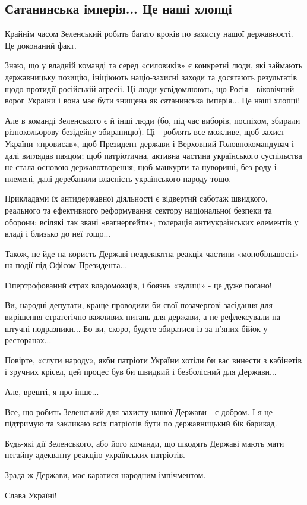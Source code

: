  
 
 
 
 

\subsection{Сатанинська імперія... Це наші хлопці}

Крайнім часом Зеленський робить багато кроків по захисту нашої державності. Це доконаний факт.

Знаю, що у владній команді та серед «силовиків» є конкретні люди, які займають
державницьку позицію, ініціюють націо-захисні заходи та досягають результатів
щодо протидії російській агресіі. Ці люди усвідомлюють, що Росія - віковічний
ворог України і вона має бути знищена як сатанинська імперія... Це наші хлопці!

Але в команді Зеленського є й інші люди (бо, під час виборів, поспіхом, збирали
різнокольорову безідейну збираницю). Ці - роблять все можливе, щоб захист
України «провисав», щоб Президент держави і Верховний Головнокомандувач і далі
виглядав паяцом; щоб патріотична, активна частина українського суспільства не
стала основою державотворення; щоб манкурти та нувориші, без роду і племені,
далі деребанили власність українського народу тощо.

Прикладами їх антидержавної діяльності є відвертий саботаж швидкого, реального
та ефективного реформування сектору національної безпеки та оборони; всілякі
так звані «вагнергейти»; толерація антиукраїнських елементів у владі і близько
до неї тощо...

Також, не йде на користь Державі неадекватна реакція частини «монобільшості» на події під Офісом Президента... 

Гіпертрофований страх владоможців, і боязнь «вулиці» - це дуже погано!

Ви, народні депутати, краще проводили би свої позачергові засідання для
вирішення стратегічно-важливих питань для держави, а не рефлексували на штучні
подразники... Бо ви, скоро,  будете збиратися із-за п’яних бійок у
ресторанах...

Повірте, «слуги народу», якби патріоти України хотіли би вас винести з
кабінетів і зручних крісел, цей процес був би швидкий і безболісний для
Держави...

Але, врешті, я про інше... 

Все, що робить Зеленський для захисту нашої Держави - є добром. І я це
підтримую та закликаю всіх патріотів бути по державницький бік барикад.

Будь-які дії Зеленського, або його команди, що шкодять Державі мають мати
негайну адекватну реакцію українських патріотів.

Зрада ж Держави, має каратися народним імпічментом.

Слава Україні!
